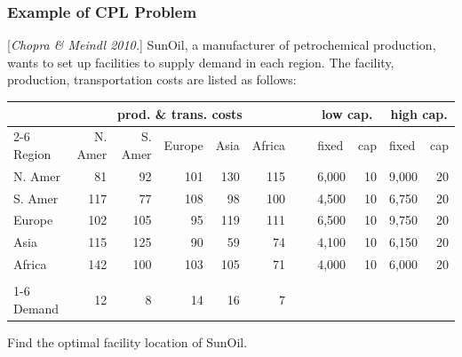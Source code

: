 \documentclass[10pt,handout,notes=show]{beamer}
\begin{document}
\begin{frame}
  \frametitle{Example of CPL  Problem }

  \footnotesize{[\emph{Chopra \& Meindl 2010.}] SunOil, a manufacturer of petrochemical production, wants to set up facilities to supply demand in each region. The facility, production, transportation costs are listed as follows:
  \begin{center}
  \begin{tabular}{lrrrrrclrlr} \hline \hline
       & \multicolumn{5}{c}{prod. \& trans. costs} & ~& \multicolumn{2}{c}{low cap.} & \multicolumn{2}{c}{high cap.} \\ \cline{2-6} \cline{8-9} \cline{10-11}
    Region & N. Amer & S. Amer & Europe & Asia & Africa & & fixed & cap  & fixed & cap \\ \hline
    N. Amer      & 81 & 92 & 101 & 130 & 115 & & 6,000 & 10 &  9,000 & 20 \\
    S. Amer      & 117& 77 & 108 & 98  & 100 & & 4,500 & 10 &  6,750 & 20 \\
    Europe        & 102& 105& 95  & 119 & 111 & & 6,500 & 10 &  9,750 & 20 \\
    Asia          & 115& 125& 90  & 59  & 74  & & 4,100 & 10 &  6,150 & 20 \\
    Africa        & 142& 100& 103 & 105 & 71  & & 4,000 & 10 &  6,000 & 20 \\
    \\ \cline{1-6}
    Demand        & 12 & 8  & 14  & 16  & 7 \\ \hline \hline
  \end{tabular}
  \end{center}
  Find the optimal facility location of SunOil.
  }

\end{frame}
\end{document}
